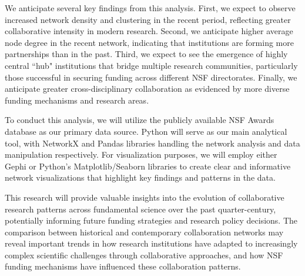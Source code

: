 \documentclass[10pt,twocolumn]{article}
\begin{document}
We anticipate several key findings from this analysis. First, we expect to observe increased network density and clustering in the recent period, reflecting greater collaborative intensity in modern research. Second, we anticipate higher average node degree in the recent network, indicating that institutions are forming more partnerships than in the past. Third, we expect to see the emergence of highly central ``hub" institutions that bridge multiple research communities, particularly those successful in securing funding across different NSF directorates. Finally, we anticipate greater cross-disciplinary collaboration as evidenced by more diverse funding mechanisms and research areas.

To conduct this analysis, we will utilize the publicly available NSF Awards database as our primary data source. Python will serve as our main analytical tool, with NetworkX and Pandas libraries handling the network analysis and data manipulation respectively. For visualization purposes, we will employ either Gephi or Python's Matplotlib/Seaborn libraries to create clear and informative network visualizations that highlight key findings and patterns in the data.

This research will provide valuable insights into the evolution of collaborative research patterns across fundamental science over the past quarter-century, potentially informing future funding strategies and research policy decisions. The comparison between historical and contemporary collaboration networks may reveal important trends in how research institutions have adapted to increasingly complex scientific challenges through collaborative approaches, and how NSF funding mechanisms have influenced these collaboration patterns.
\end{document}
